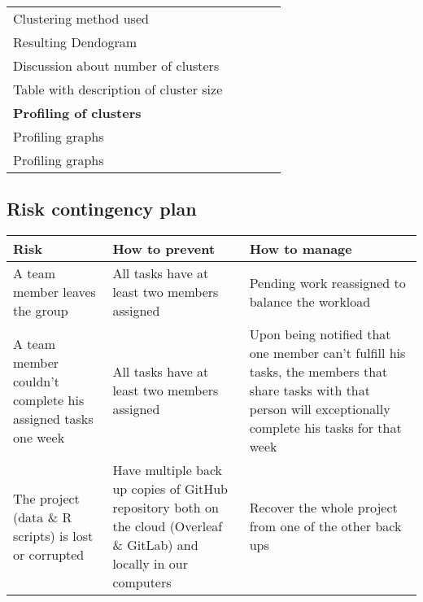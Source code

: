 \begin{table}[H]
\begin{tabular}{@{}l|c|c|c|c@{}}
Clustering method used                          &    &    &    &    \\
Resulting Dendogram                             &    &    &    &    \\
Discussion about number of clusters            &    &    &    &     \\
Table with description of cluster size          &    &    &    &    \\ \midrule
\textbf{Profiling of clusters}                  &    &    &    &    \\
Profiling graphs                                &    &    &    &    \\
Profiling graphs                                &    &    &    &     \\ \bottomrule
\end{tabular}
\end{table}

\subsection{Risk contingency plan}%
\label{sub:risk_contingency_plan}


\begin{table}[H]
\centering
\begin{tabular}{@{}p{5cm}p{5cm}p{5cm}@{}}
\toprule
Risk & How to prevent & How to manage \\ \midrule
A team member leaves the group & All tasks have at least two members assigned & Pending work reassigned to balance the workload\\
\addlinespace[0.5em]
A team member couldn't complete his assigned tasks one week & All tasks have at least two members assigned & Upon being notified that one member can't fulfill his tasks, the members that share tasks with that person will exceptionally complete his tasks for that week\\
\addlinespace[0.5em]
The project (data \& R scripts) is lost or corrupted & Have multiple back up copies of GitHub repository both on the cloud (Overleaf \& GitLab) and locally in our computers & Recover the whole project from one of the other back ups\\
\bottomrule
\end{tabular}
\end{table}

